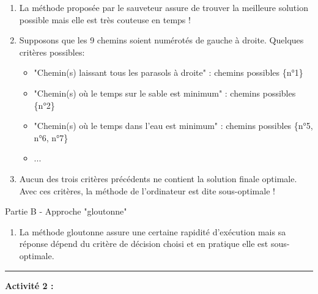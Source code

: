 \documentclass[12pt,french]{article}
\begin{document}
\begin{enumerate}
	\item La méthode proposée par le sauveteur assure de trouver la meilleure solution possible mais elle est très couteuse en temps !
	\item Supposons que les 9 chemins soient numérotés de gauche à droite. Quelques critères possibles:
	\begin{itemize}
		\item "Chemin(s) laissant tous les parasols à droite" :  chemins possibles \{n°1\}
		\item "Chemin(s) où le temps sur le sable est minimum" : chemins possibles \{n°2\}
		\item "Chemin(s) où le temps dans l'eau est minimum" : chemins possibles \{n°5, n°6, n°7\}
		\item ...\\
	\end{itemize}
\item Aucun des trois critères précédents ne contient la solution finale optimale. Avec ces critères, la méthode de l'ordinateur est dite sous-optimale !
\end{enumerate}
\begin{center}
	Partie B - Approche "gloutonne"
\end{center}
\begin{enumerate}
	\item La méthode gloutonne assure une certaine rapidité d'exécution mais sa réponse dépend du critère de décision choisi et en pratique elle est sous-optimale.
\end{enumerate}
\medskip
\hrule
\medskip
\textbf{Activité 2 :}\\
\end{document}
